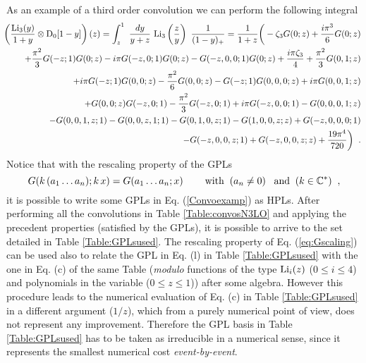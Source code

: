 \documentclass[12pt]{article}
\def\beq{\begin{equation}}
\def\eeq{\end{equation}}
\def\beeq{\begin{eqnarray}}
\def\eeeq{\end{eqnarray}}
\def\nn{\nonumber}
\newcommand\f[2]{\frac{#1}{#2}}
\begin{document}
\begin{appendix}
As an example of a third order convolution we can perform the following integral
\beeq\label{Convoexamp}
   &&\!\!\!\!\!\!\!\!\left(\f{{\rm Li}_{3}( y) }{1+y}\otimes  {\rm D}_{0}[1-y]\right)(z) = \int^{1}_{z}~\f{dy}{y+z}~{\rm Li}_{3}\left(\f{z}{y}\right)~\f{1}{(1-y)_{+}}  =\f{1}{1+z}\bigg(-  \zeta_{3} G(0;z)+\frac{i \pi ^3 }{6 }G(0;z)\nn\\
   &&\!\!\!\!\!\!\!\!\!\!+\f{\pi ^2}{3}G(-z;1) G(0;z)-i \pi  G(-z,0;1)G(0;z)-G(-z,0,0;1) G(0;z)+\frac{i\pi  \zeta_{3}}{4}+\frac{\pi ^2 }{3 }G(0,1;z)\nn\\
   &&\!\!\!\!\!\!\!\!\!\! +i \pi  G(-z;1) G(0,0;z)-\frac{\pi ^2 }{6 }G(0,0;z)-G(-z;1) G(0,0,0;z)+i \pi G(0,0,1;z)\nn\\
   &&\!\!\!\!\!\!\!\!\!\! +G(0,0;z)G(-z,0;1)-\frac{\pi ^2 }{3}G(-z,0;1)+i \pi G(-z,0,0;1)-G(0,0,0,1;z)\nn\\
   &&\!\!\!\!\!\!\!\!\!\!-G(0,0,1,z;1)-G(0,0,z,1;1)-G(0,1,0,z;1)-G(1,0,0,z;z)+G(-z,0,0,0;1)\nn\\
   &&\!\!\!\!\!\!\!\!\!\!-G(-z,0,0,z;1)+G(-z,0,0,z;z) +\frac{19 \pi ^4}{720 }\bigg)\;\;.
\eeeq
Notice that with the rescaling property of the GPLs
\beq\label{eq:Gscaling}
G(k\,(a_{1}\ldots a_{n});k\, x) = G(a_{1}\ldots a_{n};x) \;\;\;\;\;\;\;\;{\rm with}\;\; (a_n\neq 0) \;\;\;{\rm and}\;\; (k\in \mathbb{C}^*) \;\;,
\eeq
it is possible to write some GPLs in Eq. (\ref{Convoexamp}) as HPLs. After performing all the convolutions in Table  \ref{Table:convosN3LO} and applying the precedent properties (satisfied by the GPLs), it is possible to arrive to the set detailed in Table \ref{Table:GPLsused}. The rescaling property of Eq. (\ref{eq:Gscaling}) can be used also to relate the GPL in Eq. (l) in Table \ref{Table:GPLsused} with the one in Eq. (c) of the same Table (\textit{modulo} functions of the type ${\rm Li}_{i}(z)$ ($ 0 \leq i \leq 4$) and polynomials in the variable ($ 0 \leq z \leq 1$)) after some algebra. However this procedure leads to the numerical evaluation of Eq. (c) in Table \ref{Table:GPLsused} in a different argument ($1/z$), which from a purely numerical point of view, does not represent any improvement. Therefore the GPL basis in Table \ref{Table:GPLsused} has to be taken as irreducible in a numerical sense, since it represents the smallest numerical cost \textit{event-by-event}.

\end{appendix}
\end{document}
